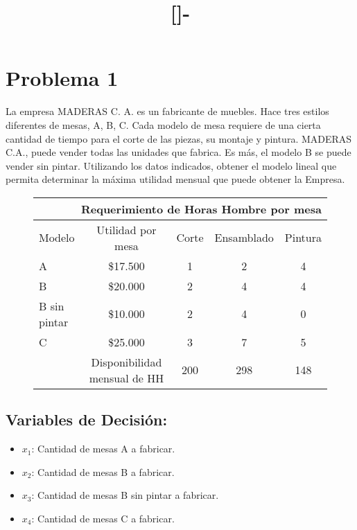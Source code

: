 \documentclass{templateNote}
\begin{document}

\title{[\asignatura]-\titulo}
\author{
    \autor
}
\portada
\margenes %

\section*{Problema 1}

La empresa MADERAS C. A. es un fabricante de muebles. Hace tres estilos diferentes de
mesas, A, B, C. Cada modelo de mesa requiere de una cierta cantidad de tiempo para el corte
de las piezas, su montaje y pintura. MADERAS C.A., puede vender todas las unidades que
fabrica. Es más, el modelo B se puede vender sin pintar. Utilizando los datos indicados,
obtener el modelo lineal que permita determinar la máxima utilidad mensual que puede
obtener la Empresa.
\begin{figure}[H]
    \centering
    \begin{tabular}{|l|c|c|c|c|}
        \hline
        \multicolumn{5}{|r|}{Requerimiento de Horas Hombre por mesa} \\ \hline
        Modelo & Utilidad por mesa & Corte & Ensamblado & Pintura \\ \hline
        A & \$17.500 & 1 & 2 & 4 \\
        B & \$20.000 & 2 & 4 & 4 \\
        B sin pintar & \$10.000 & 2 & 4 & 0 \\
        C & \$25.000 & 3 & 7 & 5 \\ \hline
          & Disponibilidad mensual de HH & 200 & 298 & 148 \\ \hline
    \end{tabular}
\end{figure}

\subsection*{Variables de Decisión:}
\begin{itemize}
    \item $x_1$: Cantidad de mesas A a fabricar.
    \item $x_2$: Cantidad de mesas B a fabricar.
    \item $x_3$: Cantidad de mesas B sin pintar a fabricar.
    \item $x_4$: Cantidad de mesas C a fabricar.
\end{itemize}
\end{document}
